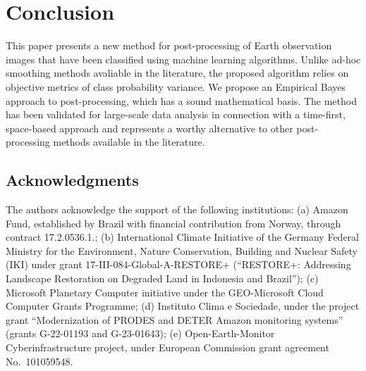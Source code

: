 \documentclass[
  shortnames]{jss}
\begin{document}
\hypertarget{conclusion}{%
\section{Conclusion}\label{conclusion}}

This paper presents a new method for post-processing of Earth observation images that have been classified using machine learning algorithms. Unlike ad-hoc smoothing methods avaliable in the literature, the proposed algorithm relies on objective metrics of class probability variance. We propose an Empirical Bayes approach to post-processing, which has a sound mathematical basis. The method has been validated for large-scale data analysis in connection with a time-first, space-based approach and represents a worthy alternative to other post-processing methods available in the literature.

\hypertarget{acknowledgments}{%
\subsection*{Acknowledgments}\label{acknowledgments}}

The authors acknowledge the support of the following institutions: (a) Amazon Fund, established by Brazil with financial contribution from Norway, through contract 17.2.0536.1.; (b) International Climate Initiative of the Germany Federal Ministry for the Environment, Nature Conservation, Building and Nuclear Safety (IKI) under grant 17-III-084-Global-A-RESTORE+ (``RESTORE+: Addressing Landscape Restoration on Degraded Land in Indonesia and Brazil''); (c) Microsoft Planetary Computer initiative under the GEO-Microsoft Cloud Computer Grants Programme; (d)
Instituto Clima e Sociedade, under the project grant ``Modernization of PRODES and DETER Amazon monitoring systems'' (grants G-22-01193 and G-23-01643); (e) Open-Earth-Monitor Cyberinfrastructure project, under European Commission grant agreement No.~101059548.


\end{document}
